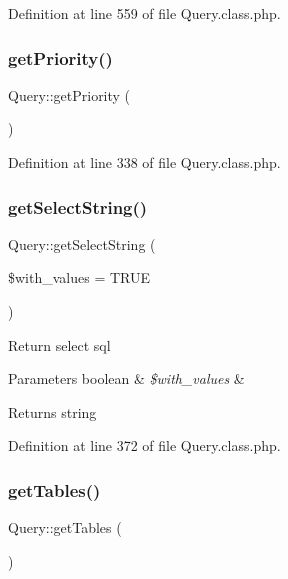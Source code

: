 Definition at line 559 of file Query.\+class.\+php.

\hypertarget{classQuery_a7c2b595ce97f0845360e21a5e8e1216d}{}\label{classQuery_a7c2b595ce97f0845360e21a5e8e1216d} 
\subsubsection{\texorpdfstring{get\+Priority()}{getPriority()}}
{\footnotesize\ttfamily Query\+::get\+Priority (\begin{DoxyParamCaption}{ }\end{DoxyParamCaption})}



Definition at line 338 of file Query.\+class.\+php.

\hypertarget{classQuery_a85639a8e09af498d2cb4eaf61a94aa25}{}\label{classQuery_a85639a8e09af498d2cb4eaf61a94aa25} 
\subsubsection{\texorpdfstring{get\+Select\+String()}{getSelectString()}}
{\footnotesize\ttfamily Query\+::get\+Select\+String (\begin{DoxyParamCaption}\item[{}]{\$with\+\_\+values = {\ttfamily TRUE} }\end{DoxyParamCaption})}

Return select sql 
\begin{DoxyParams}[1]{Parameters}
boolean & {\em \$with\+\_\+values} & \\
\hline
\end{DoxyParams}
\begin{DoxyReturn}{Returns}
string 
\end{DoxyReturn}


Definition at line 372 of file Query.\+class.\+php.

\hypertarget{classQuery_a123bec7835d39656ce7acd1daec43a17}{}\label{classQuery_a123bec7835d39656ce7acd1daec43a17} 
\subsubsection{\texorpdfstring{get\+Tables()}{getTables()}}
{\footnotesize\ttfamily Query\+::get\+Tables (\begin{DoxyParamCaption}{ }\end{DoxyParamCaption})}



